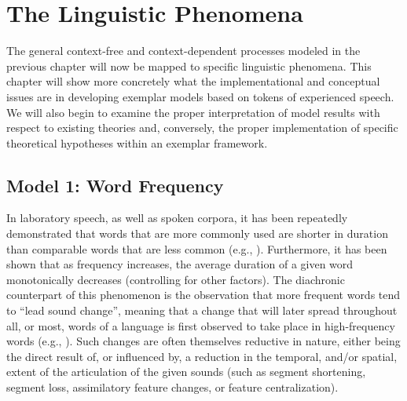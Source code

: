 \chapter{\label{subsec:The-Linguistic-Phenomena}The Linguistic Phenomena}

The general context-free and context-dependent processes modeled in
the previous chapter will now be mapped to specific linguistic phenomena.
This chapter will show more concretely what the implementational and
conceptual issues are in developing exemplar models based on tokens
of experienced speech. We will also begin to examine the proper interpretation
of model results with respect to existing theories and, conversely,
the proper implementation of specific theoretical hypotheses within
an exemplar framework. 

\section{\label{subsec:Word-Frequency}Model 1: Word Frequency}

In laboratory speech, as well as spoken corpora, it has been repeatedly
demonstrated that words that are more commonly used are shorter in
duration than comparable words that are less common (e.g., \citealt{Bybee2001,Bybee2002,Bybee2006}).
Furthermore, it has been shown that as frequency increases, the average
duration of a given word monotonically decreases (controlling for
other factors). The diachronic counterpart of this phenomenon is the
observation that more frequent words tend to “lead sound change”,
meaning that a change that will later spread throughout all, or most,
words of a language is first observed to take place in high-frequency
words (e.g., \citealt{Phillips1984}). Such changes are often themselves
reductive in nature, either being the direct result of, or influenced
by, a reduction in the temporal, and/or spatial, extent of the articulation
of the given sounds (such as segment shortening, segment loss, assimilatory
feature changes, or feature centralization).


